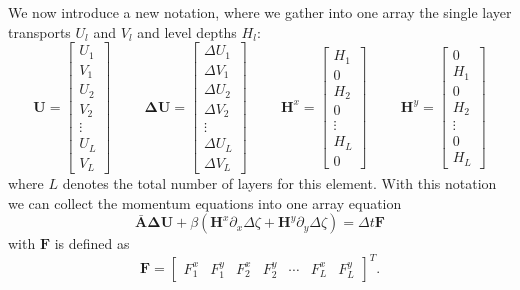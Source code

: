 \documentclass[12pt,draft]{article}
\newcommand{\Unod}{U}
\newcommand{\Vnod}{V}
\newcommand{\Udel}{\Delta U}
\newcommand{\Vdel}{\Delta V}
\newcommand{\zdel}{\Delta \zeta}
\newcommand{\UV}{\mathbf{U}}
\newcommand{\UVdel}{\mathbf{\Delta U}}
\newcommand{\HH}{\mathbf{H}}
\newcommand{\Amat}{\mathbf{\bar{A}}}
\newcommand{\FF}{\mathbf{F}}
\newcommand{\dt}{\Delta t}
\newcommand{\delx}{\partial_x}
\newcommand{\dely}{\partial_y}
\begin{document}
We now introduce a new notation, where we gather into one array
the single layer transports $\Unod_l$ and $\Vnod_l$
and level depths $H_l$: 
\begin{equation}
\UV = 
\begin{bmatrix}
 U_1 \\ V_1 \\ U_2 \\ V_2 \\ \vdots \\ U_L \\ V_L 
\end{bmatrix}
\hspace{1cm}
\UVdel =
\begin{bmatrix}
 \Udel_1 \\ \Vdel_1 \\ \Udel_2 \\ \Vdel_2 \\ \vdots \\
 \Udel_L \\ \Vdel_L 
\end{bmatrix}
\hspace{1cm}
\HH^x =
\begin{bmatrix}
 H_1 \\ 0 \\ H_2 \\ 0 \\ \vdots \\ H_L \\ 0 
\end{bmatrix}
\hspace{1cm}
\HH^y =
\begin{bmatrix}
 0 \\ H_1 \\ 0 \\ H_2 \\ \vdots \\ 0 \\ H_L 
\end{bmatrix}
\end{equation}
where $L$ denotes the total number of layers for this element.
With this notation we can collect the momentum equations into 
one array equation
\begin{equation}
	\label{momentum_intermediate}
	\Amat \UVdel + \beta(\HH^x\delx\zdel+\HH^y\dely\zdel)
	= \dt\FF 
\end{equation}
with $\FF$ is defined as
\begin{equation}
\FF = 
\begin{bmatrix}
 F^x_{1} & F^y_{1} & F^x_{2} & F^y_{2} & \cdots 
 & F^x_{L} & F^y_{L}  
\end{bmatrix}^T.
\end{equation}
\end{document}

